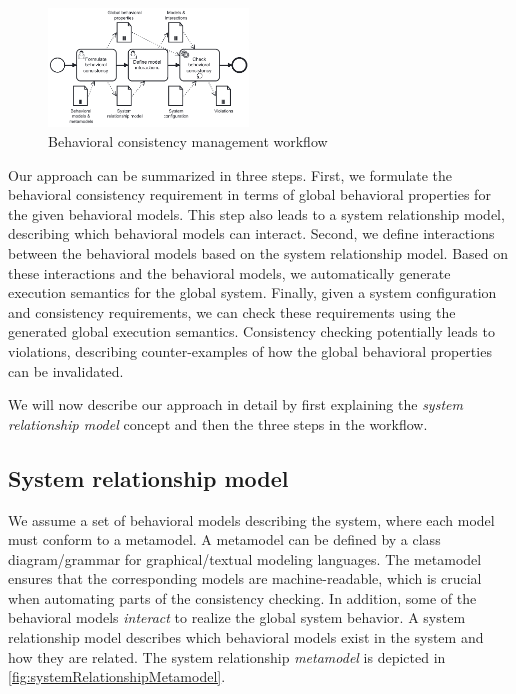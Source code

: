 \documentclass{jot}
\begin{document}
\begin{figure}[h]
    \centering
    \includegraphics[width=0.475\textwidth]{figures/workflow.pdf}
    \caption{Behavioral consistency management workflow}
    \label{fig:approach}
\end{figure}

Our approach can be summarized in three steps.
First, we formulate the behavioral consistency requirement in terms of global behavioral properties for the given behavioral models.
This step also leads to a system relationship model, describing which behavioral models can interact.
Second, we define interactions between the behavioral models based on the system relationship model.
Based on these interactions and the behavioral models, we automatically generate execution semantics for the global system.
Finally, given a system configuration and consistency requirements, we can check these requirements using the generated global execution semantics.
Consistency checking potentially leads to violations, describing counter-examples of how the global behavioral properties can be invalidated.

We will now describe our approach in detail by first explaining the \textit{system relationship model} concept and then the three steps in the workflow.

\subsection{System relationship model}
We assume a set of behavioral models describing the system, where each model must conform to a metamodel.
A metamodel can be defined by a class diagram/grammar for graphical/textual modeling languages.
The metamodel ensures that the corresponding models are machine-readable, which is crucial when automating parts of the consistency checking.
In addition, some of the behavioral models \emph{interact} to realize the global system behavior.
A system relationship model describes which behavioral models exist in the system and how they are related.
The system relationship \emph{metamodel} is depicted in \autoref{fig:systemRelationshipMetamodel}.
\end{document}

